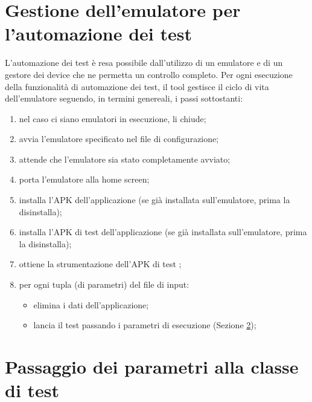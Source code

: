 


\section{Gestione dell'emulatore per l'automazione dei test}  
L'automazione dei test è resa possibile dall'utilizzo di un emulatore  e di un gestore dei device che ne permetta un controllo completo.
Per ogni esecuzione della funzionalità di automazione dei test, il tool gestisce il ciclo di vita dell'emulatore seguendo,  in termini genereali, i passi sottostanti:
\begin{enumerate}[nosep]
\item nel caso ci siano emulatori in esecuzione, li chiude;
\item avvia l'emulatore specificato nel file di configurazione;
\item attende che l'emulatore sia stato completamente avviato;
\item porta l'emulatore alla home screen;
\item installa l'APK dell'applicazione (se già installata sull'emulatore, prima la disinstalla);
\item installa l'APK di test dell'applicazione (se già installata sull'emulatore, prima la disinstalla);
\item ottiene la strumentazione dell'APK di test ;
\item per ogni tupla (di parametri) del file di input:
\begin{itemize}[nosep]
\item [1.] elimina i dati dell'applicazione;
\item [2.] lancia il test passando i parametri di esecuzione  (Sezione \ref{pasparam});
\end{itemize}
\end{enumerate}


\section{Passaggio dei parametri alla classe di test}  
\label{pasparam}

